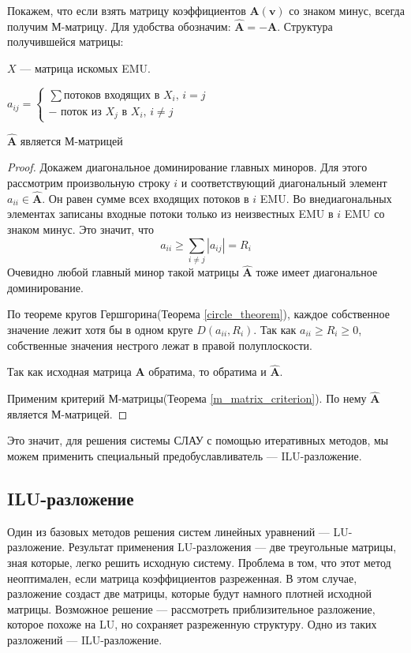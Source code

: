 \documentclass[14pt, a4paper]{extreport}
\begin{document}
Покажем, что если взять матрицу коэффициентов $\mathbf{A}(\mathbf{v})$ со знаком минус, всегда получим М-матрицу. Для удобства обозначим: $\hat{\mathbf{A}} = -\mathbf{A}$. Структура получившейся матрицы:

$X$ --- матрица искомых EMU.

$a_{ij} = 
\begin{cases} 
\text{$\sum$потоков входящих в $X_i$, $i=j$}\\
\text{$-$ поток из $X_j$ в $X_i$, $i\neq{}j$}
\end{cases}
$
\clearpage


\begin{theorem}
	$\hat{\mathbf{A}}$ является М-матрицей
\end{theorem}

\begin{proof}
	Докажем диагональное доминирование главных миноров. Для этого рассмотрим произвольную строку $i$ и соответствующий диагональный элемент $a_{ii} \in \hat{\mathbf{A}}$. Он равен сумме всех входящих потоков в $i$ EMU. Во внедиагональных элементах записаны входные потоки только из неизвестных EMU в $i$ EMU со знаком минус. Это значит, что $$a_{ii} \geq \sum_{i \neq j} |a_{ij}| = R_i$$Очевидно любой главный минор такой матрицы $\hat{\mathbf{A}}$ тоже имеет диагональное доминирование. 
	
	По теореме кругов Гершгорина(Теорема \ref{circle_theorem}), каждое собственное значение лежит хотя бы в одном круге $D(a_{ii}, R_i)$. Так как $a_{ii} \geq R_i \geq 0$, собственные значения нестрого лежат в правой полуплоскости.
	
	Так как исходная матрица $\mathbf{A}$ обратима, то обратима и $\hat{\mathbf{A}}$.
	
	Применим критерий М-матрицы(Теорема \ref{m_matrix_criterion}). По нему $\hat{\mathbf{A}}$ является М-матрицей.	
\end{proof}

Это значит, для решения системы СЛАУ с помощью итеративных методов, мы можем применить специальный предобуславливатель --- ILU-разложение. 

\clearpage


\subsection{ILU-разложение}
Один из базовых методов решения систем линейных уравнений --- LU-разложение. Результат применения LU-разложения --- две треугольные матрицы, зная которые, легко решить исходную систему. Проблема в том, что этот метод неоптимален, если матрица коэффициентов разреженная. В этом случае, разложение создаст две матрицы, которые будут намного плотней исходной матрицы. Возможное решение --- рассмотреть приблизительное разложение, которое похоже на LU, но сохраняет разреженную структуру. Одно из таких разложений --- ILU-разложение.
\end{document}
